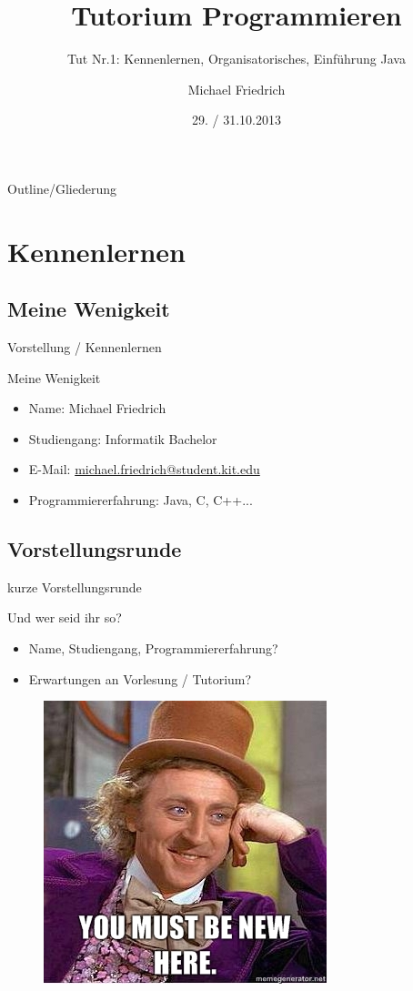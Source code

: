 \documentclass[18pt]{beamer}
\title[Prog Tut Nr. 1]{Tutorium Programmieren}
\subtitle{Tut Nr.1: Kennenlernen, Organisatorisches, Einführung Java}
\author{Michael Friedrich}
\date{29. / 31.10.2013}
\institute{Institut f\"ur theoretische Informatik}
\begin{document}

\begin{frame}
	\titlepage
\end{frame}

\begin{frame}{Outline/Gliederung}
	\tableofcontents
\end{frame}

\section{Kennenlernen}
\subsection{Meine Wenigkeit}
\begin{frame}{Vorstellung / Kennenlernen}
\begin{block}{Meine Wenigkeit}
	\begin{itemize}
		\item Name: Michael Friedrich
		\item Studiengang: Informatik Bachelor
		\item E-Mail: \url{michael.friedrich@student.kit.edu}
		\item Programmiererfahrung: Java, C, C++...
	\end{itemize}
\end{block}
\end{frame}

\subsection{Vorstellungsrunde}
\begin{frame}{kurze Vorstellungsrunde}
\begin{block}{Und wer seid ihr so?}
	\begin{itemize}
		\item Name, Studiengang, Programmiererfahrung?
		\item Erwartungen an Vorlesung / Tutorium?
	\end{itemize}
	\end{block}
	\begin{figure}%
	\center
	\includegraphics[width=0.4\columnwidth]{bild.jpg}%
	\end{figure}
\end{frame}
\end{document}
